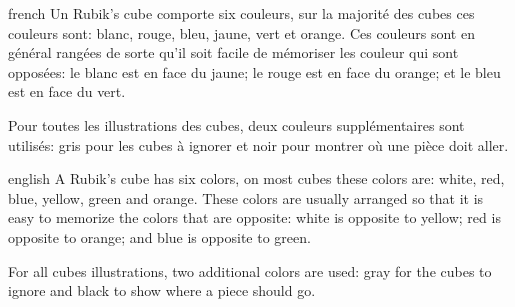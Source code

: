 \documentclass[0_Main.tex]{subfiles}
\begin{document}
\begin{shownto}{french}
Un Rubik's cube comporte six couleurs, sur la majorité des cubes ces couleurs sont: \colorbox{cblack}{\textcolor{cwhite}{blanc}}, \textcolor{cred}{rouge}, \textcolor{cblue}{bleu}, \textcolor{cyellow}{jaune}, \textcolor{cgreen}{vert} et \textcolor{corange}{orange}. Ces couleurs sont en général rangées de sorte qu'il soit facile de mémoriser les couleur qui sont opposées: le \colorbox{cblack}{\textcolor{cwhite}{blanc}} est en face du \textcolor{cyellow}{jaune}; le \textcolor{cred}{rouge} est en face du \textcolor{corange}{orange}; et le \textcolor{cblue}{bleu} est en face du \textcolor{cgreen}{vert}.

Pour toutes les illustrations des cubes, deux couleurs supplémentaires sont utilisés: \textcolor{cgray}{gris} pour les cubes à ignorer et \textcolor{cblack}{noir} pour montrer où une pièce doit aller.
\end{shownto}

\begin{shownto}{english}
A Rubik's cube has six colors, on most cubes these colors are: \colorbox{cblack}{\textcolor{cwhite}{white}}, \textcolor{cred}{red}, \textcolor{cblue}{blue}, \textcolor{cyellow}{yellow}, \textcolor{cgreen}{green} and \textcolor{corange}{orange}. These colors are usually arranged so that it is easy to memorize the colors that are opposite: \colorbox{cblack}{\textcolor{cwhite}{white}} is opposite to \textcolor{cyellow}{yellow}; \textcolor{cred}{red} is opposite to \textcolor{corange}{orange}; and \textcolor{cblue}{blue} is opposite to \textcolor{cgreen}{green}.

For all cubes illustrations, two additional colors are used: \textcolor{cgray}{gray} for the cubes to ignore and \textcolor{cblack}{black} to show where a piece should go.
\end{shownto}

\clearpage


\end{document}
